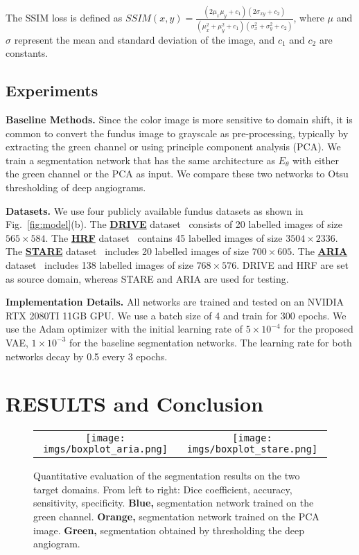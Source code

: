 \documentclass[]{spie}  %
\begin{document}
The SSIM loss is defined as
$    SSIM(x,y)=\frac{(2\mu_x\mu_y+c_1)(2\sigma_{xy}+c_2)}{(\mu_x^2+\mu_y^2+c_1)(\sigma_x^2+\sigma_y^2+c_2)}$,
where $\mu$ and $\sigma$ represent the mean and standard deviation of the image, and $c_1$ and $c_2$ are constants.

\subsection{Experiments}
\textbf{Baseline Methods.}
Since the color image is more sensitive to domain shift, it is common to convert the fundus image to grayscale as pre-processing, typically by extracting the green channel or using principle component analysis (PCA). We train a segmentation network that has the same architecture as $E_{\theta}$ with either the green channel or the PCA as input. We compare these two networks to Otsu thresholding of deep angiograms. 

\textbf{Datasets.} 
We use four publicly available fundus datasets as shown in Fig.~\ref{fig:model}(b). The {\bf \underline{DRIVE}} dataset~\cite{staal2004ridge} consists of 20 labelled images of size $565\times 584$. The {\bf\underline{HRF}} dataset~\cite{budai2013robust} contains 45 labelled images of size $3504\times 2336$. The {\bf\underline{STARE}} dataset~\cite{hoover2000locating} includes 20 labelled images of size $700\times 605$.
The {\bf\underline{ARIA}} dataset~\cite{farnell2008enhancement} includes 138 labelled images of size $768\times 576$.
DRIVE and HRF are set as source domain, whereas STARE and ARIA are used for testing.

\textbf{Implementation Details.}
All networks are trained and tested on an NVIDIA RTX 2080TI 11GB GPU. We use a batch size of 4 and train for 300 epochs. We use the Adam optimizer with the initial learning rate of $5\times 10^{-4}$ for the proposed VAE, $1\times 10^{-3}$ for the baseline segmentation networks. The learning rate for both networks decay by 0.5 every 3 epochs. 


\section{RESULTS and Conclusion}

\begin{figure}[t]
    \centering
    \begin{tabular}{c@{}c}
         \texttt{[image: imgs/boxplot\_aria.png]} &  
         \texttt{[image: imgs/boxplot\_stare.png]} \\
    \end{tabular}
    \caption{Quantitative evaluation of the segmentation results on the two target domains. From left to right: Dice coefficient, accuracy, sensitivity, specificity. {\bf Blue,}  segmentation network trained on the green channel. {\bf Orange,} segmentation network trained on the PCA image. {\bf Green,} segmentation obtained by thresholding the deep angiogram.}
    \label{fig:boxplot}
\end{figure}
\end{document}
